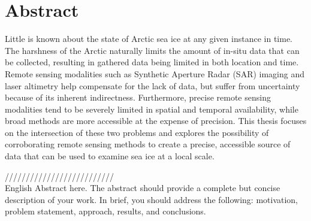 
\chapter*{Abstract}

\indent Little is known about the state of Arctic sea ice at any given instance in time. The harshness of the Arctic naturally limits the amount of in-situ data that can be collected, resulting in gathered data being limited in both location and time. Remote sensing modalities such as Synthetic Aperture Radar (SAR) imaging and laser altimetry help compensate for the lack of data, but suffer from uncertainty because of its inherent indirectness. Furthermore, precise remote sensing modalities tend to be severely limited in spatial and temporal availability, while broad methods are more accessible at the expense of precision. This thesis focuses on the intersection of these two problems and explores the possibility of corroborating remote sensing methods to create a precise, accessible source of data that can be used to examine sea ice at a local scale.
\par
//////////////////////////
\\
\indent English Abstract here. The abstract should provide a complete but concise description of your work. In brief, you should address the following: motivation, problem statement, approach, results, and conclusions. 
\par


